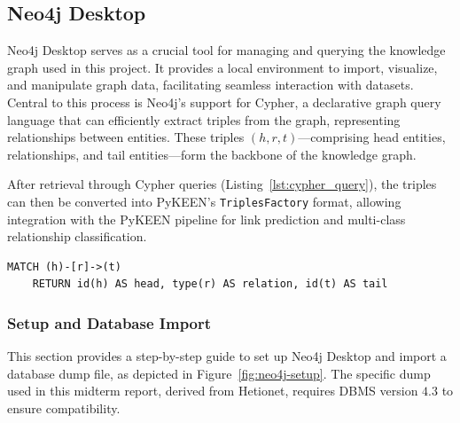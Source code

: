 \subsection*{Neo4j Desktop}

Neo4j Desktop \cite{neo4j} serves as a crucial tool for managing and querying the knowledge graph used in this project.
It provides a local environment to import, visualize, and manipulate graph data, facilitating seamless interaction with datasets.
Central to this process is Neo4j's support for Cypher, a declarative graph query language that can efficiently extract triples from the graph, representing relationships between entities.
These triples $(h, r, t)$---comprising head entities, relationships, and tail entities---form the backbone of the knowledge graph.

After retrieval through Cypher queries (Listing~\ref{lst:cypher_query}), the triples can then be converted into PyKEEN's \texttt{TriplesFactory} format, allowing integration with the PyKEEN pipeline for link prediction and multi-class relationship classification.

\begin{lstlisting}[caption=Cypher query to retrieve triples., label=lst:cypher_query]
    MATCH (h)-[r]->(t)
    RETURN id(h) AS head, type(r) AS relation, id(t) AS tail
\end{lstlisting}

\subsubsection*{Setup and Database Import}

This section provides a step-by-step guide to set up Neo4j Desktop and import a database dump file, as depicted in Figure~\ref{fig:neo4j-setup}. The specific dump used in this midterm report, derived from Hetionet, requires DBMS version $4.3$ to ensure compatibility.

